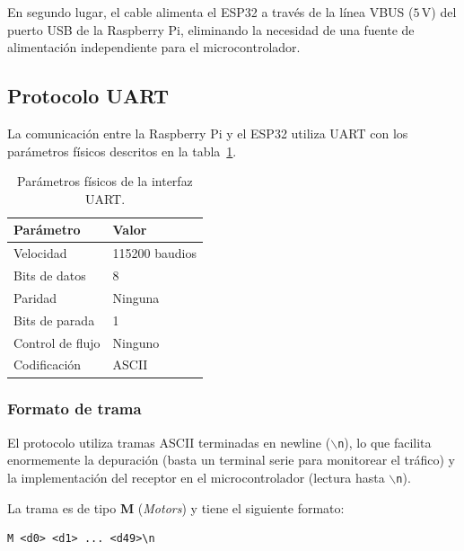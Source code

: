 En segundo lugar, el cable alimenta el ESP32 a través de la línea VBUS
($5\,\mathrm{V}$) del puerto USB de la Raspberry Pi, eliminando la
necesidad de una fuente de alimentación independiente para el
microcontrolador.

\subsection{Protocolo UART}
\label{sec:hw-uart-protocol}

La comunicación entre la Raspberry Pi y el ESP32 utiliza UART con los
parámetros físicos descritos en la tabla~\ref{tab:uart-params}.

\begin{table}[H]
\centering
\begin{tabular}{ll}
\toprule
\textbf{Parámetro} & \textbf{Valor} \\
\midrule
Velocidad   & 115200 baudios \\
Bits de datos & 8 \\
Paridad       & Ninguna \\
Bits de parada & 1 \\
Control de flujo & Ninguno \\
Codificación & ASCII \\
\bottomrule
\end{tabular}
\caption{Parámetros físicos de la interfaz UART.}
\label{tab:uart-params}
\end{table}

\subsubsection{Formato de trama}

El protocolo utiliza tramas ASCII terminadas en newline
(\texttt{$\backslash$n}), lo que facilita enormemente la depuración
(basta un terminal serie para monitorear el tráfico) y la implementación del
receptor en el microcontrolador (lectura hasta \texttt{$\backslash$n}).

La trama es de tipo \textbf{M} (\emph{Motors}) y tiene el siguiente formato:

\begin{verbatim}
M <d0> <d1> ... <d49>\n
\end{verbatim}

